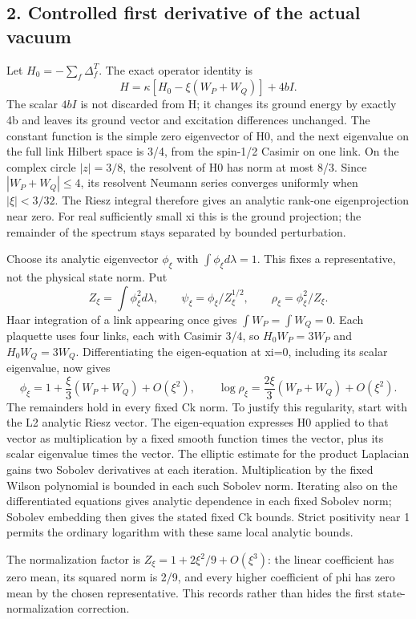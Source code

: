 \documentclass[
  11pt,
]{article}
\begin{document}
\subsection{2. Controlled first derivative of the actual
vacuum}\label{controlled-first-derivative-of-the-actual-vacuum}

Let \(H_0=-\sum_f\Delta_f^T\). The exact operator identity is \[
 H=\kappa[H_0-\xi(W_P+W_Q)]+4bI.
\] The scalar \(4bI\) is not discarded from H; it changes its ground
energy by exactly 4b and leaves its ground vector and excitation
differences unchanged. The constant function is the simple zero
eigenvector of H0, and the next eigenvalue on the full link Hilbert
space is 3/4, from the spin-1/2 Casimir on one link. On the complex
circle \(|z|=3/8\), the resolvent of H0 has norm at most 8/3. Since
\(|W_P+W_Q|\leq4\), its resolvent Neumann series converges uniformly
when \(|\xi|<3/32\). The Riesz integral therefore gives an analytic
rank-one eigenprojection near zero. For real sufficiently small xi this
is the ground projection; the remainder of the spectrum stays separated
by bounded perturbation.

Choose its analytic eigenvector \(\phi_\xi\) with
\(\int\phi_\xi d\lambda=1\). This fixes a representative, not the
physical state norm. Put \[
 Z_\xi=\int\phi_\xi^2d\lambda,\qquad
 \psi_\xi=\phi_\xi/Z_\xi^{1/2},\qquad
 \rho_\xi=\phi_\xi^2/Z_\xi.
\] Haar integration of a link appearing once gives
\(\int W_P=\int W_Q=0\). Each plaquette uses four links, each with
Casimir 3/4, so \(H_0W_P=3W_P\) and \(H_0W_Q=3W_Q\). Differentiating the
eigen-equation at xi=0, including its scalar eigenvalue, now gives \[
 \phi_\xi=1+\frac\xi3(W_P+W_Q)+O(\xi^2),\qquad
 \log\rho_\xi=\frac{2\xi}3(W_P+W_Q)+O(\xi^2).
\] The remainders hold in every fixed Ck norm. To justify this
regularity, start with the L2 analytic Riesz vector. The eigen-equation
expresses H0 applied to that vector as multiplication by a fixed smooth
function times the vector, plus its scalar eigenvalue times the vector.
The elliptic estimate for the product Laplacian gains two Sobolev
derivatives at each iteration. Multiplication by the fixed Wilson
polynomial is bounded in each such Sobolev norm. Iterating also on the
differentiated equations gives analytic dependence in each fixed Sobolev
norm; Sobolev embedding then gives the stated fixed Ck bounds. Strict
positivity near 1 permits the ordinary logarithm with these same local
analytic bounds.

The normalization factor is \(Z_\xi=1+2\xi^2/9+O(\xi^3)\): the linear
coefficient has zero mean, its squared norm is 2/9, and every higher
coefficient of phi has zero mean by the chosen representative. This
records rather than hides the first state-normalization correction.
\end{document}
